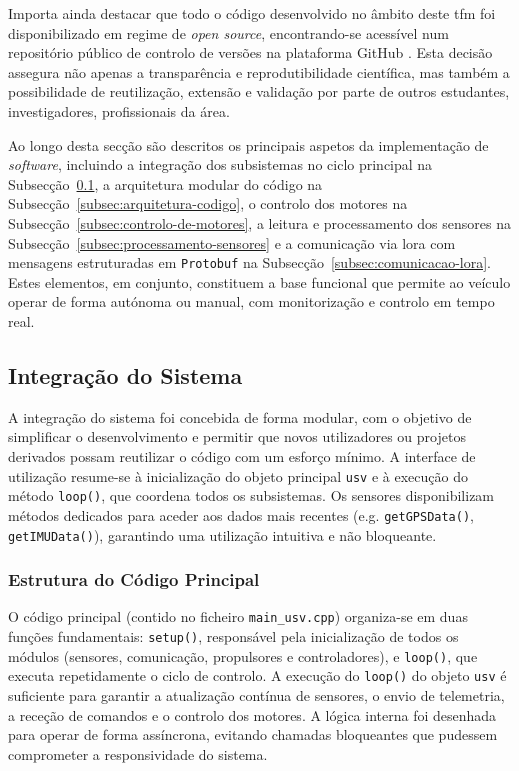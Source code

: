 Importa ainda destacar que todo o código desenvolvido no âmbito deste \gls{tfm} foi disponibilizado em regime de \emph{open source}, encontrando-se acessível num repositório público de controlo de versões na plataforma GitHub \cite{github-usv}. Esta decisão assegura não apenas a transparência e reprodutibilidade científica, mas também a possibilidade de reutilização, extensão e validação por parte de outros estudantes, investigadores, profissionais da área.

Ao longo desta secção são descritos os principais aspetos da implementação de \emph{software}, incluindo a integração dos subsistemas no ciclo principal na Subsecção~\ref{sec:integracao}, a arquitetura modular do código na Subsecção~\ref{subsec:arquitetura-codigo}, o controlo dos motores na Subsecção~\ref{subsec:controlo-de-motores}, a leitura e processamento dos sensores na Subsecção~\ref{subsec:processamento-sensores} e a comunicação via \gls{lora} com mensagens estruturadas em \texttt{Protobuf} \cite{google-protobuf} na Subsecção~\ref{subsec:comunicacao-lora}. Estes elementos, em conjunto, constituem a base funcional que permite ao veículo operar de forma autónoma ou manual, com monitorização e controlo em tempo real.

\subsection{Integração do Sistema}
\label{sec:integracao}

A integração do sistema foi concebida de forma modular, com o objetivo de simplificar o desenvolvimento e permitir que novos utilizadores ou projetos derivados possam reutilizar o código com um esforço mínimo. A interface de utilização resume-se à inicialização do objeto principal \texttt{\gls{usv}} e à execução do método \texttt{loop()}, que coordena todos os subsistemas. Os sensores disponibilizam métodos dedicados para aceder aos dados mais recentes (e.g. \texttt{getGPSData()}, \texttt{getIMUData()}), garantindo uma utilização intuitiva e não bloqueante.  

\subsubsection{Estrutura do Código Principal}

O código principal (contido no ficheiro \texttt{main\_usv.cpp}) organiza-se em duas funções fundamentais: \texttt{setup()}, responsável pela inicialização de todos os módulos (sensores, comunicação, propulsores e controladores), e \texttt{loop()}, que executa repetidamente o ciclo de controlo. A execução do \texttt{loop()} do objeto \texttt{\gls{usv}} é suficiente para garantir a atualização contínua de sensores, o envio de telemetria, a receção de comandos e o controlo dos motores. A lógica interna foi desenhada para operar de forma assíncrona, evitando chamadas bloqueantes que pudessem comprometer a responsividade do sistema. 

